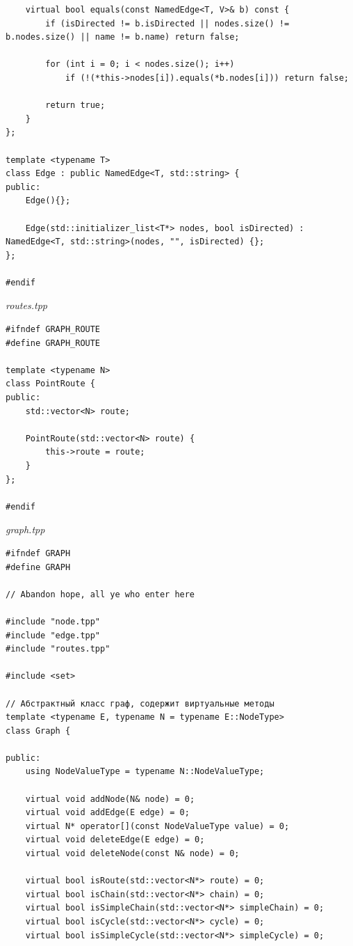 \documentclass[a4paper,14pt]{extarticle}
\begin{document}
\begin{enumerate}[1.]
\begin{verbatim}
    virtual bool equals(const NamedEdge<T, V>& b) const {
        if (isDirected != b.isDirected || nodes.size() != b.nodes.size() || name != b.name) return false;

        for (int i = 0; i < nodes.size(); i++)
            if (!(*this->nodes[i]).equals(*b.nodes[i])) return false;
        
        return true;
    }
};

template <typename T>
class Edge : public NamedEdge<T, std::string> {
public:
    Edge(){};

    Edge(std::initializer_list<T*> nodes, bool isDirected) : NamedEdge<T, std::string>(nodes, "", isDirected) {};
};

#endif
        \end{verbatim} 

        \textit{routes.tpp}
        \begin{verbatim}
#ifndef GRAPH_ROUTE
#define GRAPH_ROUTE

template <typename N>
class PointRoute {
public:
    std::vector<N> route;

    PointRoute(std::vector<N> route) {
        this->route = route;
    }
};

#endif
        \end{verbatim} 

        \textit{graph.tpp}
        \begin{verbatim}
#ifndef GRAPH
#define GRAPH

// Abandon hope, all ye who enter here

#include "node.tpp"
#include "edge.tpp"
#include "routes.tpp"

#include <set>

// Абстрактный класс граф, содержит виртуальные методы
template <typename E, typename N = typename E::NodeType>
class Graph {

public:
    using NodeValueType = typename N::NodeValueType;

    virtual void addNode(N& node) = 0;
    virtual void addEdge(E edge) = 0;
    virtual N* operator[](const NodeValueType value) = 0;
    virtual void deleteEdge(E edge) = 0;
    virtual void deleteNode(const N& node) = 0;

    virtual bool isRoute(std::vector<N*> route) = 0;
    virtual bool isChain(std::vector<N*> chain) = 0;
    virtual bool isSimpleChain(std::vector<N*> simpleChain) = 0;
    virtual bool isCycle(std::vector<N*> cycle) = 0;
    virtual bool isSimpleCycle(std::vector<N*> simpleCycle) = 0;


\end{verbatim}
\end{enumerate}
\end{document}
